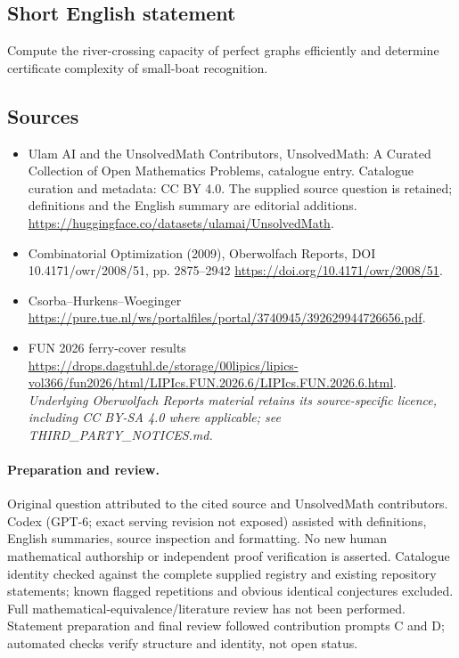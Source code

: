 \documentclass[11pt]{article}
\begin{document}
\subsection{Short English statement}
Compute the river-crossing capacity of perfect graphs efficiently and determine certificate complexity of small-boat recognition.
\subsection{Sources}
\begin{itemize}
\item[\hypertarget{source:statement:1}{S1}] Ulam AI and the UnsolvedMath Contributors, UnsolvedMath: A Curated Collection of Open Mathematics Problems, catalogue entry. Catalogue curation and metadata: CC BY 4.0. The supplied source question is retained; definitions and the English summary are editorial additions.
\url{https://huggingface.co/datasets/ulamai/UnsolvedMath}.
\item[\hypertarget{source:statement:2}{S2}] Combinatorial Optimization (2009), Oberwolfach Reports, DOI 10.4171/owr/2008/51, pp. 2875--2942
\url{https://doi.org/10.4171/owr/2008/51}.
\item[\hypertarget{source:statement:3}{S3}] Csorba--Hurkens--Woeginger
\url{https://pure.tue.nl/ws/portalfiles/portal/3740945/392629944726656.pdf}.
\item[\hypertarget{source:statement:4}{S4}] FUN 2026 ferry-cover results
\url{https://drops.dagstuhl.de/storage/00lipics/lipics-vol366/fun2026/html/LIPIcs.FUN.2026.6/LIPIcs.FUN.2026.6.html}.
\textit{Underlying Oberwolfach Reports material retains its source-specific licence, including CC BY-SA 4.0 where applicable; see THIRD\_PARTY\_NOTICES.md.}
\end{itemize}
\paragraph{Preparation and review.}
Original question attributed to the cited source and UnsolvedMath contributors. Codex (GPT-6; exact serving revision not exposed) assisted with definitions, English summaries, source inspection and formatting. No new human mathematical authorship or independent proof verification is asserted. Catalogue identity checked against the complete supplied registry and existing repository statements; known flagged repetitions and obvious identical conjectures excluded. Full mathematical-equivalence/literature review has not been performed. Statement preparation and final review followed contribution prompts C and D; automated checks verify structure and identity, not open status.
\label{end:statement}
\end{document}
